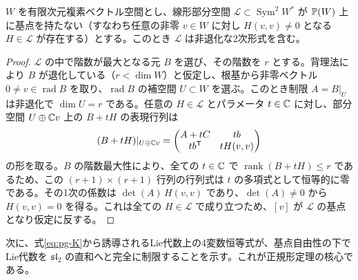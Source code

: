 \begin{lemma}\label{lem:pg-nondegenerate-pencil}
$W$ を有限次元複素ベクトル空間とし、線形部分空間 $\mathcal L\subset\operatorname{Sym}^2W^*$ が $\mathbb P(W)$ 上に基点を持たない（すなわち任意の非零 $v\in W$ に対し $H(v,v)\ne0$ となる $H\in\mathcal L$ が存在する）とする。このとき $\mathcal L$ は非退化な2次形式を含む。
\end{lemma}
\begin{proof}
$\mathcal L$ の中で階数が最大となる元 $B$ を選び、その階数を $r$ とする。背理法により $B$ が退化している（$r<\dim W$）と仮定し、根基から非零ベクトル $0\ne v\in\operatorname{rad}B$ を取り、$\operatorname{rad}B$ の補空間 $U\subset W$ を選ぶ。このとき制限 $A=B|_U$ は非退化で $\dim U=r$ である。任意の $H\in\mathcal L$ とパラメータ $t\in\mathbb C$ に対し、部分空間 $U\oplus\mathbb C v$ 上の $B+tH$ の表現行列は
\begin{equation}\label{eq:pg-bordered-pencil}
(B+tH)|_{U\oplus\mathbb C v}=
\begin{pmatrix}A+tC&tb\\t b^{\mathsf T}&tH(v,v)\end{pmatrix}
\end{equation}
の形を取る。$B$ の階数最大性により、全ての $t\in\mathbb C$ で $\operatorname{rank}(B+tH)\le r$ であるため、この $(r+1)\times(r+1)$ 行列の行列式は $t$ の多項式として恒等的に零である。その1次の係数は $\det(A)\,H(v,v)$ であり、$\det(A)\ne0$ から $H(v,v)=0$ を得る。これは全ての $H\in\mathcal L$ で成り立つため、$[v]$ が $\mathcal L$ の基点となり仮定に反する。
\end{proof}

次に、式\eqref{eq:pg-K}から誘導されるLie代数上の4変数恒等式が、基点自由性の下でLie代数を $\mathfrak{sl}_2$ の直和へと完全に制限することを示す。これが正規形定理の核心である。

